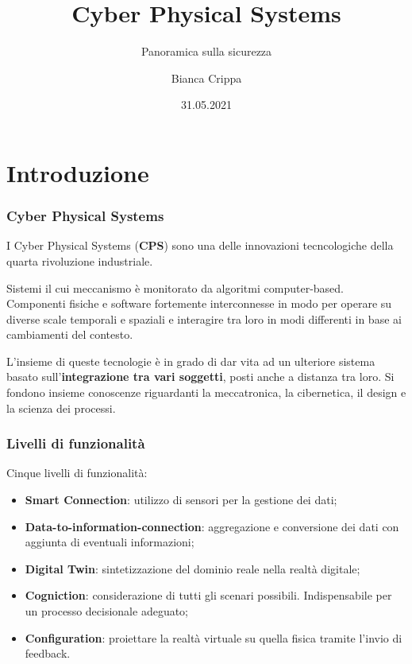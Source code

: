 \documentclass{beamer}
\title{Cyber Physical Systems}
\subtitle{Panoramica sulla sicurezza}
\author{Bianca Crippa}
\institute{Università degli Studi di Bergamo
    \\ \url{https://github.com/Biancolinaa/CPS-presentation.git}
}
\date{31.05.2021}
\begin{document}
\frame{\titlepage}


\section{Introduzione}

\begin{frame}
    \frametitle{Cyber Physical Systems}
    I Cyber Physical Systems (\textbf{CPS}) sono una delle innovazioni tecncologiche della quarta rivoluzione industriale.
    
    Sistemi il cui meccanismo è monitorato da algoritmi computer-based. 
    Componenti fisiche e software fortemente interconnesse in modo per operare su diverse scale temporali e spaziali e  
    interagire tra loro in modi differenti in base ai cambiamenti del contesto. 

    L'insieme di queste tecnologie è in grado di dar vita ad un ulteriore sistema basato sull'\textbf{integrazione tra vari soggetti}, posti anche a 
    distanza tra loro.    
    Si fondono insieme conoscenze riguardanti la meccatronica, la cibernetica, il design e la scienza dei processi.
    
\end{frame}

\begin{frame}
\frametitle{Livelli di funzionalità}

    Cinque livelli di funzionalità:
    \begin{itemize}
        \item \textbf{Smart Connection}: utilizzo di sensori per la gestione dei dati;
        \item \textbf{Data-to-information-connection}: aggregazione e conversione dei dati con aggiunta di eventuali informazioni;
        \item \textbf{Digital Twin}: sintetizzazione del dominio reale nella realtà digitale;
        \item \textbf{Cogniction}: considerazione di tutti gli scenari possibili. Indispensabile per un processo decisionale adeguato;
        \item \textbf{Configuration}: proiettare la realtà virtuale su quella fisica tramite l'invio di feedback.
    \end{itemize}
    
\end{frame}
\end{document}
